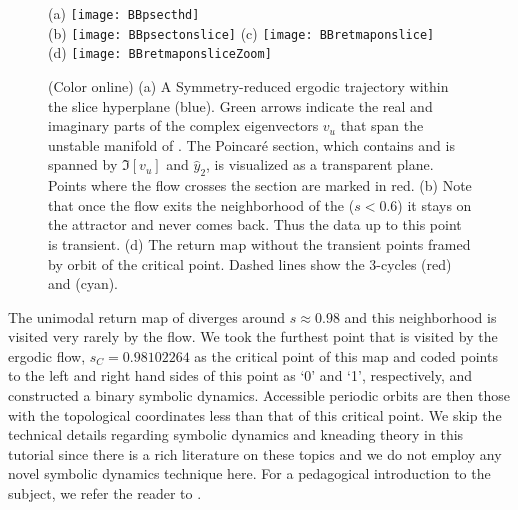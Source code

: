 \begin{figure}
\centering
  (a) \texttt{[image: BBpsecthd]} \\
  (b) \texttt{[image: BBpsectonslice]}
  (c) \texttt{[image: BBretmaponslice]} \\
  (d) \texttt{[image: BBretmaponsliceZoom]}
\caption{(Color online)
         (a) A Symmetry-reduced ergodic trajectory within the slice hyperplane 
             (blue). Green arrows indicate the real and imaginary parts of the 
             complex eigenvectors $v_u$ that span the unstable manifold of 
             \REQV{}{}. The Poincar\'e section, which contains \REQV{}{} and 
             is spanned by $\Im[v_u]$ and $\hat{y}_2$, is visualized as a 
             transparent plane. Points where the flow crosses the section are marked 
             in red.
		 (b)  
			 Note that once the flow exits the neighborhood of the \REQV{}{} 
			 ($s < 0.6$) it stays on the attractor and never comes back. Thus the data 
			 up to this point is transient.
		 (d) The return map without the transient points framed by orbit of the 
		     critical point. Dashed lines show the 3-cycles  (red) and 
		      (cyan).}
\label{fig:psectandretmap}
\end{figure}

The unimodal return map of  diverges around
$s \approx 0.98$ and this neighborhood is visited very rarely by the flow. We
took the furthest point that is visited by the ergodic flow, $s_C=0.98102264$
as the critical point of this map and coded points to the left and right hand sides of this
point as `0' and `1', respectively, and constructed a binary symbolic dynamics.
Accessible periodic orbits are then those with the topological coordinates
less than that of this critical point. We skip the technical details
regarding symbolic dynamics and kneading theory in this tutorial since
there is a rich literature on these topics and we do not employ any novel
symbolic dynamics technique here. For a pedagogical introduction to the
subject, we refer the reader to .

